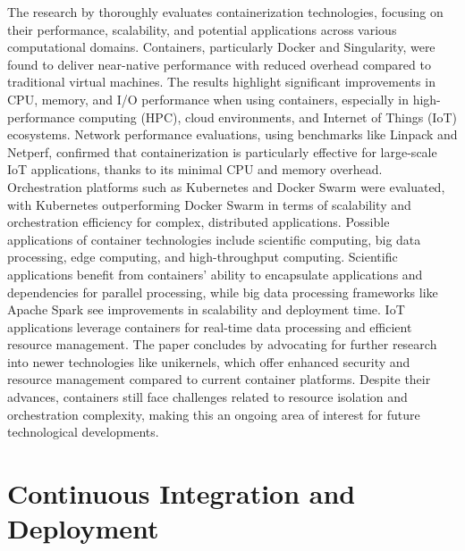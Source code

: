 The research by \citet{bentalebContainerizationTechnologiesTaxonomies2022} thoroughly evaluates containerization technologies, focusing on their performance, scalability, and potential applications across various computational domains.
Containers, particularly Docker and Singularity, were found to deliver near-native performance with reduced overhead compared to traditional virtual machines.
The results highlight significant improvements in CPU, memory, and I/O performance when using containers, especially in high-performance computing (HPC), cloud environments, and Internet of Things (IoT) ecosystems.
Network performance evaluations, using benchmarks like Linpack and Netperf, confirmed that containerization is particularly effective for large-scale IoT applications, thanks to its minimal CPU and memory overhead.
Orchestration platforms such as Kubernetes and Docker Swarm were evaluated, with Kubernetes outperforming Docker Swarm in terms of scalability and orchestration efficiency for complex, distributed applications.
Possible applications of container technologies include scientific computing, big data processing, edge computing, and high-throughput computing.
Scientific applications benefit from containers' ability to encapsulate applications and dependencies for parallel processing, while big data processing frameworks like Apache Spark see improvements in scalability and deployment time.
IoT applications leverage containers for real-time data processing and efficient resource management.
The paper concludes by advocating for further research into newer technologies like unikernels, which offer enhanced security and resource management compared to current container platforms.
Despite their advances, containers still face challenges related to resource isolation and orchestration complexity, making this an ongoing area of interest for future technological developments.

\section{Continuous Integration and Deployment}

